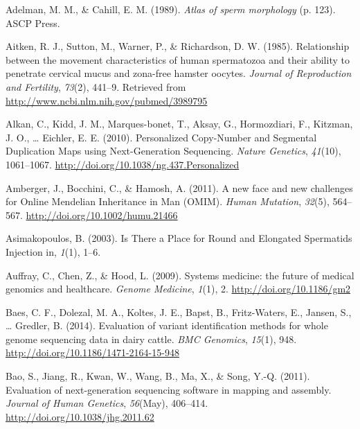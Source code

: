\documentclass[12pt,twoside]{reedthesis}
\theoremstyle{definition}
\theoremstyle{definition}
\theoremstyle{remark}
\begin{document}
  \noindent
  
  \setlength{\parindent}{-0.20in} \setlength{\leftskip}{0.20in}
  \setlength{\parskip}{8pt}
  
  \hypertarget{refs}{}
  \hypertarget{ref-Adelman1989}{}
  Adelman, M. M., \& Cahill, E. M. (1989). \emph{Atlas of sperm
  morphology} (p. 123). ASCP Press.
  
  \hypertarget{ref-Aitken1985}{}
  Aitken, R. J., Sutton, M., Warner, P., \& Richardson, D. W. (1985).
  Relationship between the movement characteristics of human spermatozoa
  and their ability to penetrate cervical mucus and zona-free hamster
  oocytes. \emph{Journal of Reproduction and Fertility}, \emph{73}(2),
  441--9. Retrieved from \url{http://www.ncbi.nlm.nih.gov/pubmed/3989795}
  
  \hypertarget{ref-Alkan2010}{}
  Alkan, C., Kidd, J. M., Marques-bonet, T., Aksay, G., Hormozdiari, F.,
  Kitzman, J. O., \ldots{} Eichler, E. E. (2010). Personalized Copy-Number
  and Segmental Duplication Maps using Next-Generation Sequencing.
  \emph{Nature Genetics}, \emph{41}(10), 1061--1067.
  \url{http://doi.org/10.1038/ng.437.Personalized}
  
  \hypertarget{ref-Amberger2011}{}
  Amberger, J., Bocchini, C., \& Hamosh, A. (2011). A new face and new
  challenges for Online Mendelian Inheritance in Man (OMIM). \emph{Human
  Mutation}, \emph{32}(5), 564--567.
  \url{http://doi.org/10.1002/humu.21466}
  
  \hypertarget{ref-Asimakopoulos2003}{}
  Asimakopoulos, B. (2003). Is There a Place for Round and Elongated
  Spermatids Injection in, \emph{1}(1), 1--6.
  
  \hypertarget{ref-Auffray2009}{}
  Auffray, C., Chen, Z., \& Hood, L. (2009). Systems medicine: the future
  of medical genomics and healthcare. \emph{Genome Medicine}, \emph{1}(1),
  2. \url{http://doi.org/10.1186/gm2}
  
  \hypertarget{ref-Baes2014}{}
  Baes, C. F., Dolezal, M. A., Koltes, J. E., Bapst, B., Fritz-Waters, E.,
  Jansen, S., \ldots{} Gredler, B. (2014). Evaluation of variant
  identification methods for whole genome sequencing data in dairy cattle.
  \emph{BMC Genomics}, \emph{15}(1), 948.
  \url{http://doi.org/10.1186/1471-2164-15-948}
  
  \hypertarget{ref-Bao2011}{}
  Bao, S., Jiang, R., Kwan, W., Wang, B., Ma, X., \& Song, Y.-Q. (2011).
  Evaluation of next-generation sequencing software in mapping and
  assembly. \emph{Journal of Human Genetics}, \emph{56}(May), 406--414.
  \url{http://doi.org/10.1038/jhg.2011.62}
  
\end{document}
